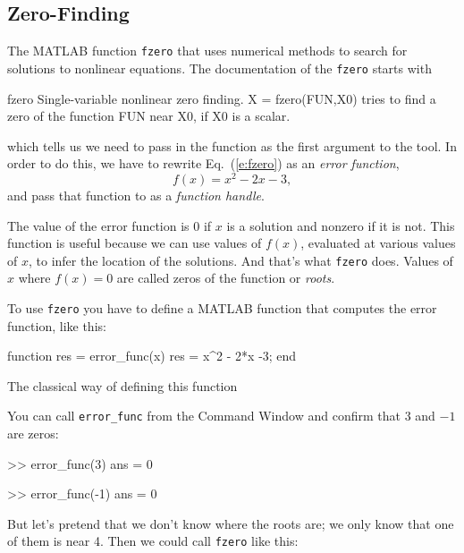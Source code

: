 \subsection{Zero-Finding}
\label{zero}


The MATLAB function \lstinline{fzero} that uses numerical methods to search for solutions to nonlinear equations. The documentation of the \lstinline{fzero} starts with
\begin{stdout}
fzero  Single-variable nonlinear zero finding. 
    X = fzero(FUN,X0) tries to find a zero of the function FUN near X0, 
    if X0 is a scalar. 
\end{stdout}
which tells us we need to pass in the function  as the first argument to the  tool.
In order to do this, we have to rewrite Eq.~(\ref{e:fzero}) as an \emph{error function},
\begin{equation*}
f(x) = x^2 - 2x -3,
\end{equation*}
and pass that function to  as a \emph{function handle}.

The value of the error function is 0 if $x$ is a solution and nonzero if it is not.
This function is useful because we can use values of $f(x)$, evaluated at various values of $x$, to infer the location of the solutions.  And that's what \lstinline{fzero} does.
Values of $x$ where $f(x) = 0$ are called zeros of the function or \emph{roots}.


To use \lstinline{fzero} you have to define a MATLAB function that computes the error function, like this:
\begin{code}
function res = error_func(x)
    res = x^2 - 2*x -3;
end
\end{code}
The classical way of defining this function 

You can call \lstinline{error_func} from the Command Window and confirm that $3$ and $-1$ are zeros:

\begin{code}
>> error_func(3)
ans = 0

>> error_func(-1)
ans = 0
\end{code}

But let's pretend that we don't know where the roots are; we only know that one of them is near 4.  Then we could call \lstinline{fzero} like this:

